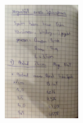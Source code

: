 \begin{minipage}[t]{0.4\textwidth}
    \includegraphics[height=5cm, page=5]{scans_messdaten/v308_spulenpaar.pdf}
\end{minipage}
%
%